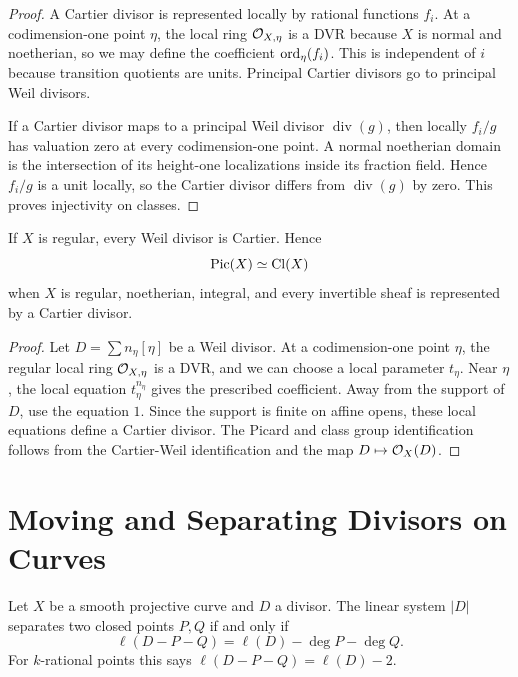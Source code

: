 \begin{proof}
A Cartier divisor is represented locally by rational functions \(f_i\).  At a
codimension-one point \(\eta\), the local ring \(\mathcal{O}_{X,\eta}\) is a DVR
because \(X\) is normal and noetherian, so we may define the coefficient
\(\operatorname{ord}_\eta(f_i)\).  This is independent of \(i\) because transition quotients
are units.  Principal Cartier divisors go to principal Weil divisors.

If a Cartier divisor maps to a principal Weil divisor \(\operatorname{div}(g)\),
then locally \(f_i/g\) has valuation zero at every codimension-one point.  A
normal noetherian domain is the intersection of its height-one localizations
inside its fraction field.  Hence \(f_i/g\) is a unit locally, so the Cartier
divisor differs from \(\operatorname{div}(g)\) by zero.  This proves
injectivity on classes.
\end{proof}

\begin{proposition}
If \(X\) is regular, every Weil divisor is Cartier.  Hence
\[
    \operatorname{Pic}(X)\simeq \operatorname{Cl}(X)
\]
when \(X\) is regular, noetherian, integral, and every invertible sheaf is
represented by a Cartier divisor.
\end{proposition}

\begin{proof}
Let \(D=\sum n_\eta[\eta]\) be a Weil divisor.  At a codimension-one point
\(\eta\), the regular local ring \(\mathcal{O}_{X,\eta}\) is a DVR, and we can choose a
local parameter \(t_\eta\).  Near \(\eta\), the local equation
\(t_\eta^{n_\eta}\) gives the prescribed coefficient.  Away from the support of
\(D\), use the equation \(1\).  Since the support is finite on affine opens,
these local equations define a Cartier divisor.  The Picard and class group
identification follows from the Cartier-Weil identification and the map
\(D\mapsto\mathcal{O}_X(D)\).
\end{proof}

\section{Moving and Separating Divisors on Curves}

\begin{proposition}
Let \(X\) be a smooth projective curve and \(D\) a divisor.  The linear system
\(|D|\) separates two closed points \(P,Q\) if and only if
\[
    \ell(D-P-Q)=\ell(D)-\deg P-\deg Q.
\]
For \(k\)-rational points this says \(\ell(D-P-Q)=\ell(D)-2\).
\end{proposition}

